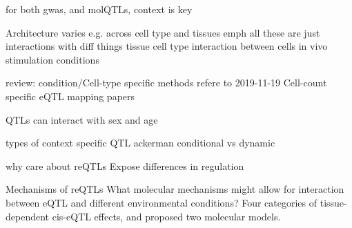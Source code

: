 \begin{outline}
    \2 for both gwas, and molQTLs, context is key

\1 Architecture varies e.g. across cell type and tissues
\1 emph all these are just interactions with diff things
    \2 tissue
    \2 cell type
    \2 interaction between cells in vivo
    \2 stimulation conditions

review: condition/Cell-type specific methods
    refere to 2019-11-19 Cell-count specific eQTL mapping papers

\1 QTLs can interact with sex and age

\1 types of context specific QTL
    \2 ackerman conditional vs dynamic

\1 why care about reQTLs
Expose differences in regulation



\1 Mechanisms of reQTLs
What molecular mechanisms might allow for interaction between \Gls{eQTL} and different environmental conditions?
Four categories of tissue-dependent cis-eQTL effects, and proposed two molecular models.


\end{outline}
